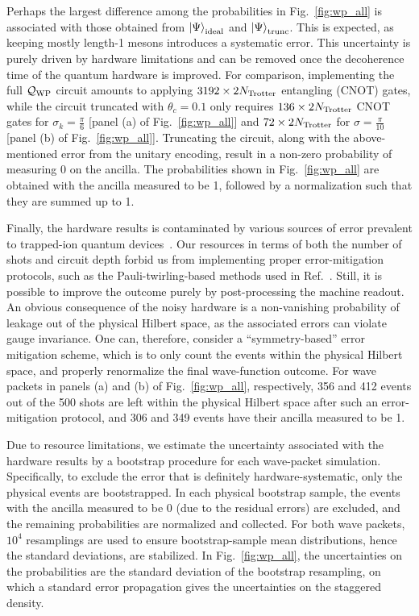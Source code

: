 \documentclass[a4paper,onecolumn,11pt,accepted=2024-10-11]{quantumarticle}
\begin{document}
Perhaps the largest difference among the probabilities in Fig.~\ref{fig:wp_all} is associated with those obtained from $\ket{\Psi}_\text{ideal}$ and $\ket{\Psi}_\text{trunc}$. This is expected, as keeping mostly length-1 mesons introduces a systematic error. This uncertainty is purely driven by hardware limitations and can be removed once the decoherence time of the quantum hardware is improved. For comparison, implementing the full $\mathcal{Q}_{\rm WP}$ circuit amounts to applying $3192 \times 2N_{\rm Trotter}$ entangling (CNOT) gates, while the circuit truncated with $\theta_c=0.1$ only requires $136\times 2N_{\rm Trotter}$ CNOT gates for $\sigma_k=\frac{\pi}{6}$ [panel (a) of Fig.~\ref{fig:wp_all}] and $72\times 2N_{\rm Trotter}$ for $\sigma=\frac{\pi}{10}$ [panel (b) of Fig.~\ref{fig:wp_all}]. Truncating the circuit, along with the above-mentioned error from the unitary encoding, result in a non-zero probability of measuring 0 on the ancilla. The probabilities shown in Fig.~\ref{fig:wp_all} are obtained with the ancilla measured to be 1, followed by a normalization such that they are summed up to 1. 

Finally, the hardware results is contaminated by various sources of error prevalent to trapped-ion quantum devices~\cite{QuantinuumRef}. Our resources in terms of both the number of shots and circuit depth forbid us from implementing proper error-mitigation protocols, such as the Pauli-twirling-based methods used in Ref.~\cite{Farrell:2023fgd}. Still, it is possible to improve the outcome purely by post-processing the machine readout. An obvious consequence of the noisy hardware is a non-vanishing probability of leakage out of the physical Hilbert space, as the associated errors can violate gauge invariance. One can, therefore, consider a ``symmetry-based'' error mitigation scheme, which is to only count the events within the physical Hilbert space, and properly renormalize the final wave-function outcome. For wave packets in panels (a) and (b) of Fig.~\ref{fig:wp_all}, respectively, 356 and 412 events out of the 500 shots are left within the physical Hilbert space after such an error-mitigation protocol, and 306 and 349 events have their ancilla measured to be 1.  

Due to resource limitations, we estimate the uncertainty associated with the hardware results by a bootstrap procedure for each wave-packet simulation. Specifically, to exclude the error that is definitely hardware-systematic, only the physical events are bootstrapped. In each physical bootstrap sample, the events with the ancilla measured to be 0 (due to the residual errors) are excluded, and the remaining probabilities are normalized and collected. For both wave packets, $10^4$ resamplings are used to ensure bootstrap-sample mean distributions, hence the standard deviations, are stabilized. In Fig.~\ref{fig:wp_all}, the uncertainties on the probabilities are the standard deviation of the bootstrap resampling, on which a standard error propagation gives the uncertainties on the staggered density. 
\end{document}

